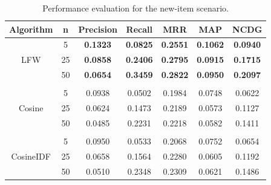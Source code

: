 \documentclass{sig-alternate}
\begin{document}
\begin{table}[ht]
    \centering
    \caption{Performance evaluation for the new-item scenario.}
    \label{tab1}
    \setlength{\tabcolsep}{2pt}
    \begin{tabular}{ccccccc}
        \hline
        Algorithm & n  & Precision       & Recall          & MRR             & MAP             & NCDG            \\ \hline
            & 5  & \textbf{0.1323} & \textbf{0.0825} & \textbf{0.2551} & \textbf{0.1062} & \textbf{0.0940} \\
        LFW       & 25 & \textbf{0.0858} & \textbf{0.2406} & \textbf{0.2795} & \textbf{0.0915} &     \textbf{0.1715} \\
          & 50 & \textbf{0.0654} & \textbf{0.3459} & \textbf{0.2822} & \textbf{0.0950} & \textbf{0.2097} \\
          &    &                 &                 &                 &                 &                 \\
          & 5  & 0.0938          & 0.0502          & 0.1984          & 0.0748          & 0.0622          \\
        Cosine    & 25 & 0.0624          & 0.1473          & 0.2189          & 0.0573          & 0.1127          \\
          & 50 & 0.0485          & 0.2231          & 0.2218          & 0.0582          & 0.1411          \\
          &    &                 &                 &                 &                 &                 \\
          & 5  & 0.0950          & 0.0533          & 0.2068          & 0.0752          & 0.0654          \\
        CosineIDF & 25 & 0.0658          & 0.1564          & 0.2280          & 0.0605          & 0.1192          \\
          & 50 & 0.0510          & 0.2348          & 0.2309          & 0.0621          & 0.1486          \\ \hline
\end{tabular}
\end{table}
\end{document}
